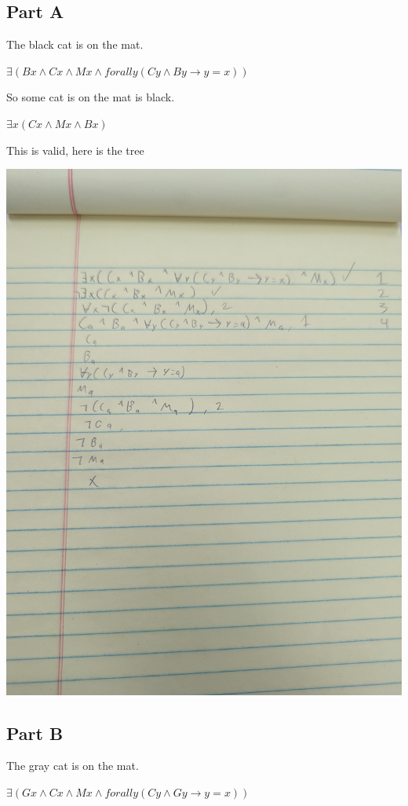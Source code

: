 \documentclass[12pt]{article}
\begin{document}
\subsection*{Part A}

The black cat is on the mat. 

$\exists (Bx \land Cx \land Mx \land forall y (Cy \land By \rightarrow y = x))$

So some cat is on the mat is black.

$\exists x (Cx \land Mx \land Bx)$

This is valid, here is the tree

\includegraphics[width=\textwidth]{3a}

\subsection*{Part B}

The gray cat is on the mat. 

$\exists (Gx \land Cx \land Mx \land forall y (Cy \land Gy \rightarrow y = x))$
\end{document}
